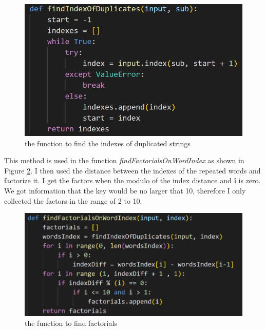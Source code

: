 \documentclass[12pt, letterpaper]{article}
\begin{document}
\begin{figure}
  \includegraphics[width=\linewidth]{code_snippets/findIndexOfDuplicates.PNG}
  \caption{the function to find the indexes of duplicated strings}
  \label{fig:findIndexOfDuplicates}
\end{figure}

This method is used in the function \textit{findFactorialsOnWordIndex} as shown in Figure \ref{fig:findFactorialsOnWordIndex}. I then used the distance between the indexes of the repeated words and factorize it. I get the factors when the modulo of the index distance and \textbf{i} is zero. We got information that the key would be no larger that 10, therefore I only collected the factors in the range of 2 to 10.

\begin{figure}
  \includegraphics[width=\linewidth]{code_snippets/findFactorialsOnWordIndex.PNG}
  \caption{the function to find factorials}
  \label{fig:findFactorialsOnWordIndex}
\end{figure}
\end{document}
